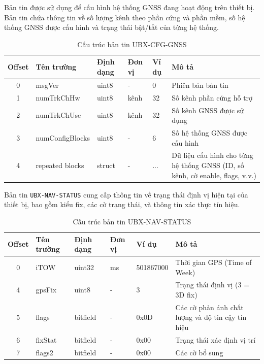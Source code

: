 \documentclass[../DoAn.tex]{subfiles}
\begin{document}
Bản tin  được sử dụng để cấu hình hệ thống GNSS đang hoạt động trên thiết bị. Bản tin chứa thông tin về số lượng kênh theo phần cứng và phần mềm, số hệ thống GNSS được cấu hình và trạng thái bật/tắt của từng hệ thống.

\begin{table}[H]
\centering
\begin{tabular}{|c|l|l|l|l|p{6cm}|}
\hline
\textbf{Offset} & \textbf{Tên trường} & \textbf{Định dạng} & \textbf{Đơn vị} & \textbf{Ví dụ} & \textbf{Mô tả} \\
\hline
0 & msgVer & uint8 & - & 0 & Phiên bản bản tin \\
\hline
1 & numTrkChHw & uint8 & kênh & 32 & Số kênh phần cứng hỗ trợ \\
\hline
2 & numTrkChUse & uint8 & kênh & 32 & Số kênh GNSS được sử dụng \\
\hline
3 & numConfigBlocks & uint8 & - & 6 & Số hệ thống GNSS được cấu hình \\
\hline
4 & repeated blocks & struct & - & ... & Dữ liệu cấu hình cho từng hệ thống GNSS (ID, số kênh, cờ enable, flags, v.v.) \\
\hline
\end{tabular}
\caption{Cấu trúc bản tin UBX-CFG-GNSS}
\end{table}

Bản tin \texttt{UBX-NAV-STATUS} cung cấp thông tin về trạng thái định vị hiện tại của thiết bị, bao gồm kiểu fix, các cờ trạng thái, và thông tin xác thực tín hiệu.

\begin{table}[H]
\centering
\begin{tabular}{|c|l|l|l|l|p{6cm}|}
\hline
\textbf{Offset} & \textbf{Tên trường} & \textbf{Định dạng} & \textbf{Đơn vị} & \textbf{Ví dụ} & \textbf{Mô tả} \\
\hline
0 & iTOW & uint32 & ms & 501867000 & Thời gian GPS (Time of Week) \\
\hline
4 & gpsFix & uint8 & - & 3 & Trạng thái định vị (3 = 3D fix) \\
\hline
5 & flags & bitfield & - & 0x0D & Các cờ phản ánh chất lượng và độ tin cậy tín hiệu \\
\hline
6 & fixStat & bitfield & - & 0x00 & Trạng thái xác định vị trí \\
\hline
7 & flags2 & bitfield & - & 0x00 & Các cờ bổ sung \\
\hline
\end{tabular}
\caption{Cấu trúc bản tin UBX-NAV-STATUS}
\end{table}
\end{document}
